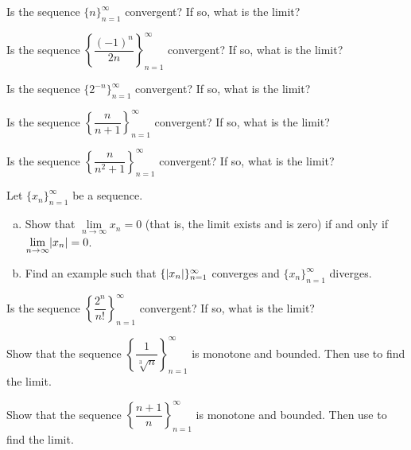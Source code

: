 \begin{exercise}
Is the sequence
$\{ n \}_{n=1}^\infty$
convergent?  If so, what is the limit?
\end{exercise}

\begin{exercise}
Is the sequence
$\left\{ \dfrac{{(-1)}^n}{2n} \right\}_{n=1}^\infty$
convergent?  If so, what is the limit?
\end{exercise}

\begin{exercise}
Is the sequence
$\{ 2^{-n} \}_{n=1}^\infty$
convergent?  If so, what is the limit?
\end{exercise}

\begin{exercise}
Is the sequence
$\left\{ \dfrac{n}{n+1} \right\}_{n=1}^\infty$
convergent?  If so, what is the limit?
\end{exercise}

\begin{exercise}
Is the sequence
$\left\{ \dfrac{n}{n^2+1} \right\}_{n=1}^\infty$
convergent?  If so, what is the limit?
\end{exercise}

\begin{exercise} \label{exercise:absconv}
Let $\{ x_n \}_{n=1}^\infty$ be a sequence.
\begin{enumerate}[a)]
\item Show that $\lim\limits_{n\to\infty} x_n = 0$ (that is, the limit exists and is zero)
if and only if $\lim\limits_{n\to\infty} \lvert {x_n} \rvert = 0$.
\item Find an example such that $\{ \lvert {x_n} \rvert \}_{n=1}^\infty$ converges and
$\{ x_n \}_{n=1}^\infty$
diverges.
\end{enumerate}
\end{exercise}

\begin{exercise}
Is the sequence
$\left\{ \dfrac{2^n}{n!} \right\}_{n=1}^\infty$
convergent?  If so, what is the limit?
\end{exercise}

\begin{exercise}
Show that the sequence
$\left\{ \dfrac{1}{\sqrt[3]{n}} \right\}_{n=1}^\infty$ is monotone and bounded.  Then use
 to find the limit.
\end{exercise}

\begin{exercise}
Show that the sequence
$\left\{ \dfrac{n+1}{n} \right\}_{n=1}^\infty$
is monotone and bounded.  Then use
 to find the limit.
\end{exercise}

